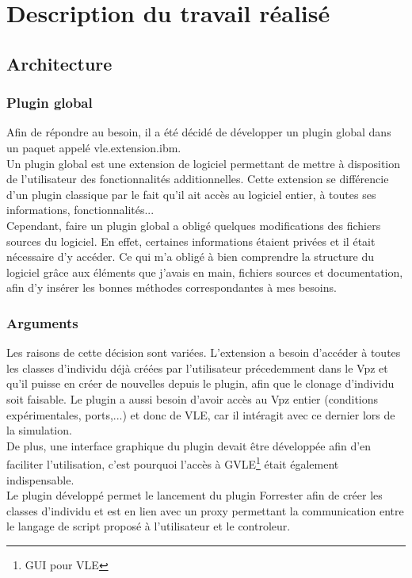 \chapter{Description du travail réalisé}
\setlength{\parskip}{2.5ex plus .4ex minus .4ex}

\section{Architecture}
\subsection{Plugin global}
Afin de répondre au besoin, il a été décidé de développer un plugin global dans un paquet appelé vle.extension.ibm.\\
Un plugin global est une extension de logiciel permettant de mettre à disposition de l'utilisateur des fonctionnalités additionnelles. Cette extension se différencie d'un plugin classique par le fait qu'il ait accès au logiciel entier, à toutes ses informations, fonctionnalités...\\
Cependant, faire un plugin global a obligé quelques modifications des fichiers sources du logiciel. En effet, certaines informations étaient privées et il était nécessaire d'y accéder. Ce qui m'a obligé à bien comprendre la structure du logiciel grâce aux éléments que j'avais en main, fichiers sources et documentation, afin d'y insérer les bonnes méthodes correspondantes à mes besoins.

\subsection{Arguments}
Les raisons de cette décision sont variées. L'extension a besoin d'accéder à toutes les classes d'individu déjà créées par l'utilisateur précedemment dans le Vpz et qu'il puisse en créer de nouvelles depuis le plugin, afin que le clonage d'individu soit faisable. Le plugin a aussi besoin d'avoir accès au Vpz entier (conditions expérimentales, ports,...) et donc de VLE, car il intéragit avec ce dernier lors de la simulation.\\
De plus, une interface graphique du plugin devait être développée afin d'en faciliter l'utilisation, c'est pourquoi l'accès à GVLE\footnote{GUI pour VLE} était également indispensable.\\

Le plugin développé permet le lancement du plugin Forrester afin de créer les classes d'individu et est en lien avec un proxy permettant la communication entre le langage de script proposé à l'utilisateur et le controleur.\\

